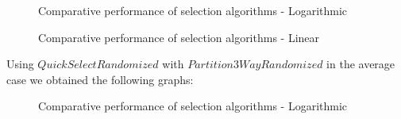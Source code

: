 \documentclass{article}
\begin{document}
\begin{figure}[H]   
  \caption{Comparative performance of selection algorithms - Logarithmic}
\end{figure}

\begin{figure}[H]   
  \caption{Comparative performance of selection algorithms - Linear}
\end{figure}

Using $QuickSelectRandomized$ with $Partition3WayRandomized$ in the average case we obtained the following graphs:

\begin{figure}[H]   
  \caption{Comparative performance of selection algorithms - Logarithmic}
\end{figure}
\end{document}
